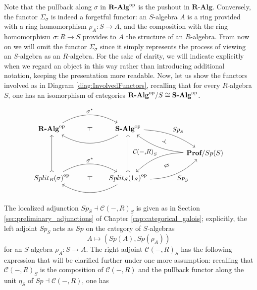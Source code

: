 Note that the pullback along $\sigma$ in ${\textbf{R-Alg}}^{\mathrm{op}}$ is the pushout in $\textbf{R-Alg}$. Conversely, the functor $\Sigma_\sigma$ is indeed a forgetful functor: an $S$-algebra $A$ is a ring provided with a ring homomorphism $\rho_A:S\to A$, and the composition with the ring homomorphism $\sigma:R\to S$ provides to $A$ the structure of an $R$-algebra. From now on we will omit the functor $\Sigma_\sigma$ since it simply represents the process of viewing an $S$-algebra as an $R$-algebra. For the sake of clarity, we will indicate explicitly when we regard an object in this way rather than introducing additional notation, keeping the presentation more readable. Now, let us show the functors involved as in Diagram \ref{diag:InvolvedFunctors}, recalling that for every $R$-algebra $S$, one has an isomorphism of categories ${\textbf{R-Alg}}^{\mathrm{op}}/S\cong{\textbf{S-Alg}}^{\mathrm{op}}$.

\begin{equation}
\label{diag:InvolvedFunctorsRing}
    \begin{tikzcd}[every label/.append style = {font = \small}]
        \opcat{\textbf{R-Alg}} \arrow[rr, "\sigma^*", bend left, ""{name=pull}] & & \opcat{\textbf{S-Alg}} \arrow[ll, bend left, ""{name=comp}] \arrow[rrd, "{Sp}_S", bend left=15, ""{name=Sps}] \\ & & & & \textbf{Prof}/Sp(S) \arrow[llu, "{\mathcal{C}(-{,}R)}_S", bend left=15, ""{name=Cs}] \arrow[dll, bend right=20, ""{name=Csequi}] \\ \opcat{Split_R(\sigma)} \arrow[uu, tail] \arrow[rr, "\sigma^*", bend left, ""{name=pullres}] & & \opcat{Split_S(1_S)} \arrow[uu, tail] \arrow[urr, bend right=20, "{Sp}_S"', ""{name=Spsequi}] \arrow[ll, bend left, ""{name=compres}] \arrow[phantom, from=pull, to=comp, "\dashv" rotate=90] \arrow[phantom, from=pullres, to=compres, "\dashv" rotate=90] \arrow[phantom, from=Sps, to=Cs, "\dashv" rotate=-120] \arrow[phantom, from=Spsequi, to=Csequi, "\approx" rotate=30]
    \end{tikzcd}
\end{equation}

The localized adjunction ${Sp}_S\dashv{\mathcal{C}(-,R)}_S$ is given as in Section \ref{sec:preliminary_adjunctions} of Chapter \ref{cap:categorical_galois}; explicitly, the left adjoint ${Sp}_S$ acts as $Sp$ on the category of $S$-algebras
\[ A\longmapsto (Sp(A),Sp(\rho_A)) \]
for an $S$-algebra $\rho_A:S\to A$. The right adjoint ${\mathcal{C}(-,R)}_S$ has the following expression that will be clarified further under one more assumption: recalling that ${\mathcal{C}(-,R)}_S$ is the composition of $\mathcal{C}(-,R)$ and the pullback functor along the unit $\eta_S$ of $Sp\dashv\mathcal{C}(-,R)$, one has

